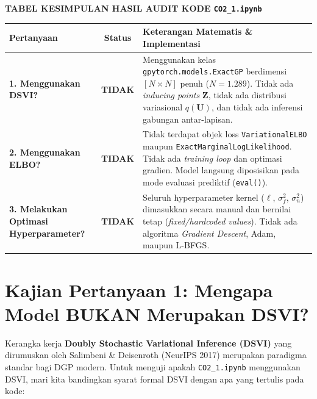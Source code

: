 \documentclass[11pt,a4paper]{article}
\begin{document}
\begin{mathbox}
\begin{center}
\textbf{\large TABEL KESIMPULAN HASIL AUDIT KODE \texttt{CO2\_1.ipynb}}
\end{center}
\vspace{0.1cm}
\begin{tabularx}{\textwidth}{p{4.2cm} c X}
\toprule
\textbf{Pertanyaan} & \textbf{Status} & \textbf{Keterangan Matematis \& Implementasi} \\
\midrule
\textbf{1. Menggunakan DSVI?} & \textcolor{dgpred}{\textbf{TIDAK}} & Menggunakan kelas \texttt{gpytorch.models.ExactGP} berdimensi $[N \times N]$ penuh ($N = 1.289$). Tidak ada \textit{inducing points} $\mathbf{Z}$, tidak ada distribusi variasional $q(\mathbf{U})$, dan tidak ada inferensi gabungan antar-lapisan. \\
\addlinespace[4pt]
\textbf{2. Menggunakan ELBO?} & \textcolor{dgpred}{\textbf{TIDAK}} & Tidak terdapat objek loss \texttt{VariationalELBO} maupun \texttt{ExactMarginalLogLikelihood}. Tidak ada \textit{training loop} dan optimasi gradien. Model langsung diposisikan pada mode evaluasi prediktif (\texttt{eval()}). \\
\addlinespace[4pt]
\textbf{3. Melakukan Optimasi Hyperparameter?} & \textcolor{dgpred}{\textbf{TIDAK}} & Seluruh hyperparameter kernel ($\ell$, $\sigma_f^2$, $\sigma_n^2$) dimasukkan secara manual dan bernilai tetap (\textit{fixed/hardcoded values}). Tidak ada algoritma \textit{Gradient Descent}, Adam, maupun L-BFGS. \\
\bottomrule
\end{tabularx}
\end{mathbox}

\vspace{0.2cm}

\section{Kajian Pertanyaan 1: Mengapa Model BUKAN Merupakan DSVI?}
\label{sec:analisis_dsvi}

\noindent Kerangka kerja \textbf{Doubly Stochastic Variational Inference (DSVI)} yang dirumuskan oleh Salimbeni \& Deisenroth (NeurIPS 2017) merupakan paradigma standar bagi DGP modern. Untuk menguji apakah \texttt{CO2\_1.ipynb} menggunakan DSVI, mari kita bandingkan syarat formal DSVI dengan apa yang tertulis pada kode:
\end{document}
